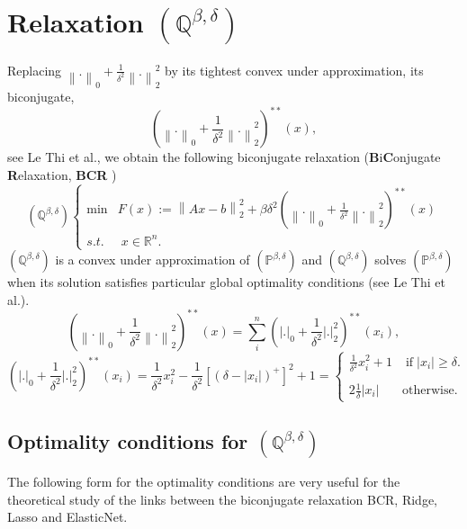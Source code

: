 \documentclass[fleqn]{report} %
\newcommand\ddfrac[2]{\frac{\displaystyle #1}{\displaystyle #2}}
\begin{document}
		\section{Relaxation $(\mathbb{Q}^{\beta,\delta})$}
Replacing $\left\|.\right\|_0 +\frac{1}{\delta^2} \left\|.\right\|^2_2$ by its tightest convex under approximation, its biconjugate, 
		\[
			\left(\left\|.\right\|_0 + \frac{1}{\delta^2} \left\|.\right\|_2^2\right)^{**}(x),
		\]
		see Le Thi et al., we obtain the following biconjugate relaxation (\textbf{B}i\textbf{C}onjugate \textbf{R}elaxation,  \textbf{BCR} )
		\[
		(\mathbb{Q}^{\beta,\delta})\left\{\begin{array}{ll}\min & F(x):=\left\|Ax-b\right\|^2_2 + \beta\delta^2\left(\left\|.\right\|_0 + \frac{1}{\delta^2}\left\|.\right\|_2^2\right)^{**}(x)\\
		s.t.&\;x\in\mathbb{R}^n.
		\end{array} \right.
		\]
$(\mathbb{Q}^{\beta,\delta})$ is a convex under approximation of $(\mathbb{P}^{\beta,\delta})$ and $(\mathbb{Q}^{\beta,\delta})$ solves $(\mathbb{P}^{\beta,\delta})$ when its solution satisfies particular global optimality conditions (see Le Thi et al.).
		\[
			\left(\left\|.\right\|_0 + \ddfrac{1}{\delta^2}\left\|.\right\|_2^2\right)^{**}(x) = \sum_{i}^{n}\left(\left|.\right|_0 + \ddfrac{1}{\delta^2} \left|.\right|_2^2\right)^{**}(x_i),
		\]
\[
\left(\left|.\right|_0 + \ddfrac{1}{\delta^2} \left|.\right|_2^2\right)^{**}(x_i)=\ddfrac{1}{\delta^2} x_i^2  - \ddfrac{1}{\delta^2} \left[\left(\delta-\left|x_i\right|\right)^+\right]^2 +1=\left\{ \begin{array}{ll}
 \ddfrac{1}{\delta^2}x_i^2 + 1 &\;\text{if}\;\left|x_i\right|\geq \delta.\\
&\\
 2\ddfrac{1}{\delta}\left|x_i\right|& \text{otherwise}.
\end{array}
\right.
\]
\subsection{Optimality conditions for $(\mathbb{Q}^{\beta,\delta})$}
The following  form for the optimality conditions are very useful for the theoretical study of the links between the biconjugate relaxation BCR, Ridge, Lasso and ElasticNet.
\end{document}
